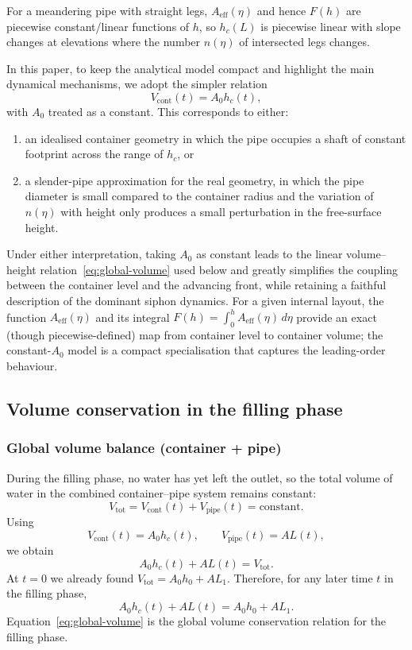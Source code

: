 \documentclass[11pt]{article}
\begin{document}
For a meandering pipe with straight legs, $A_{\text{eff}}(\eta)$ and hence $F(h)$ are piecewise
constant/linear functions of $h$, so $h_c(L)$ is piecewise linear with slope changes at
elevations where the number $n(\eta)$ of intersected legs changes.

In this paper, to keep the analytical model compact and highlight the main dynamical
mechanisms, we adopt the simpler relation
\[
  V_{\text{cont}}(t) = A_0 h_c(t),
\]
with $A_0$ treated as a constant. This corresponds to either:
\begin{enumerate}
  \item an idealised container geometry in which the pipe occupies a shaft of constant footprint
        across the range of $h_c$, or
  \item a slender-pipe approximation for the real geometry, in which the pipe diameter is small
        compared to the container radius and the variation of $n(\eta)$ with height only
        produces a small perturbation in the free-surface height.
\end{enumerate}
Under either interpretation, taking $A_0$ as constant leads to the linear volume--height
relation~\eqref{eq:global-volume} used below and greatly simplifies the coupling between the container level and the
advancing front, while retaining a faithful description of the dominant siphon dynamics.
For a given internal layout, the function $A_{\text{eff}}(\eta)$ and its integral
$F(h)=\int_0^{h}A_{\text{eff}}(\eta)\,d\eta$ provide an exact (though piecewise-defined)
map from container level to container volume; the constant-$A_0$ model is a compact
specialisation that captures the leading-order behaviour.

\subsection{Volume conservation in the filling phase}

\subsubsection{Global volume balance (container + pipe)}

During the filling phase, no water has yet left the outlet, so the total volume of water in the
combined container--pipe system remains constant:
\[
  V_{\text{tot}} = V_{\text{cont}}(t) + V_{\text{pipe}}(t) = \text{constant}.
\]
Using
\[
  V_{\text{cont}}(t) = A_0 h_c(t),\qquad
  V_{\text{pipe}}(t) = A L(t),
\]
we obtain
\[
  A_0 h_c(t) + A L(t) = V_{\text{tot}}.
\]
At $t = 0$ we already found $V_{\text{tot}} = A_0 h_0 + A L_1$. Therefore, for any later time
$t$ in the filling phase,
\begin{equation}
  A_0 h_c(t) + A L(t) = A_0 h_0 + A L_1.
  \label{eq:global-volume}
\end{equation}
Equation~\eqref{eq:global-volume} is the global volume conservation relation for the filling phase.
\end{document}
